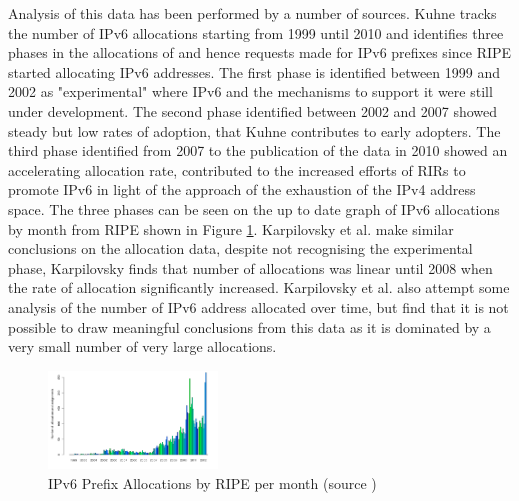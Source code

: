 Analysis of this data has been performed by a number of sources. Kuhne tracks
the number of IPv6 allocations starting from 1999 until 2010 and identifies three
phases in the allocations of and hence requests made for IPv6 prefixes since
RIPE started allocating IPv6 addresses\cite{kuhne_interesting_2010}.
The first phase is identified between 1999 and
2002 as "experimental" where IPv6 and the mechanisms to support it were still
under development. The second phase identified between 2002 and 2007 showed
steady but low rates of adoption, that Kuhne contributes to early adopters. The
third phase identified from 2007 to the publication of the data in 2010 showed
an accelerating allocation rate, contributed to the increased efforts of RIRs
to promote IPv6 in light of the approach of the exhaustion of the IPv4 address
space. The three phases can be seen on the up to date graph of IPv6 allocations
by month from RIPE shown in Figure \ref{fig:alloc-month}. Karpilovsky et al. make
similar conclusions on the allocation data, despite not recognising the
experimental phase, Karpilovsky finds that number of allocations was linear
until 2008 when the rate of allocation significantly increased\cite{karpilovsky_quantifying_2009}.
Karpilovsky et
al. also attempt some analysis of the number of IPv6 address allocated over
time, but find that it is not possible to draw meaningful conclusions from this
data as it is dominated by a very small number of very large allocations.

\begin{figure}[htb]
\centering
\includegraphics[width=0.4\textwidth]{img/v6-alloc-month.png}
\caption{IPv6 Prefix Allocations by RIPE per month (source \protect\cite{ripe_ncc_total_2013})}
\label{fig:alloc-month}
\end{figure}


